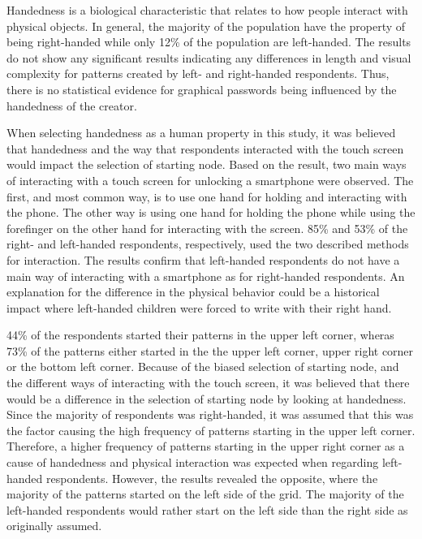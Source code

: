     Handedness is a biological characteristic that relates to how people interact with physical objects. In general, the majority of the population have the property of being right-handed while only 12\% of the population are left-handed. The results do not show any significant results indicating any differences in length and visual complexity for patterns created by left- and right-handed respondents. Thus, there is no statistical evidence for graphical passwords being influenced by the handedness of the creator.

    When selecting handedness as a human property in this study, it was believed that handedness and the way that respondents interacted with the touch screen would impact the selection of starting node. Based on the result, two main ways of interacting with a touch screen for unlocking a smartphone were observed. The first, and most common way, is to use one hand for holding and interacting with the phone. The other way is using one hand for holding the phone while using the forefinger on the other hand for interacting with the screen. 85\% and 53\% of the right- and left-handed respondents, respectively, used the two described methods for interaction. The results confirm that left-handed respondents do not have a main way of interacting with a smartphone as for right-handed respondents. An explanation for the difference in the physical behavior could be a historical impact where left-handed children were forced to write with their right hand.

    44\% of the respondents started their patterns in the upper left corner, wheras 73\% of the patterns either started in the the upper left corner, upper right corner or the bottom left corner. Because of the biased selection of starting node, and the different ways of interacting with the touch screen, it was believed that there would be a difference in the selection of starting node by looking at handedness. Since the majority of respondents was right-handed, it was assumed that this was the factor causing the high frequency of patterns starting in the upper left corner. Therefore, a higher frequency of patterns starting in the upper right corner as a cause of handedness and physical interaction was expected when regarding left-handed respondents. However, the results revealed the opposite, where the majority of the patterns started on the left side of the grid. The majority of the left-handed respondents would rather start on the left side than the right side as originally assumed.

